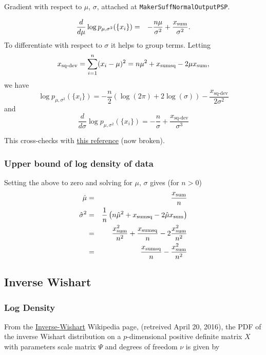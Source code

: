 \documentclass[12pt]{article}
\begin{document}
Gradient with respect to $\mu$, $\sigma$, attached at \texttt{MakerSuffNormalOutputPSP}.

\begin{eqnarray*}
\frac{d}{d\mu} \log p_{\mu,\sigma^2}(\{x_i\}) & = & -\frac{n\mu}{\sigma^2} +
    \frac{x_{\textrm{sum}}}{\sigma^2}.
\end{eqnarray*}
To differentiate with respect to $\sigma$ it helps to group terms.  Letting
\newcommand{\deviance}{x_{\textrm{sq-dev}}}
\[ \deviance = \sum_{i=1}^n (x_i - \mu)^2 = n\mu^2 + \xsumsq - 2 \mu \xsum, \]
we have
\[ \log p_{\mu,\sigma^2}(\{x_i\}) = -\frac{n}{2}(\log(2\pi) + 2\log(\sigma))
   - \frac{\deviance}{2\sigma^2} \]
and
\[ \frac{d}{d\sigma} \log p_{\mu,\sigma^2}(\{x_i\}) = -\frac{n}{\sigma} +
    \frac{\deviance}{\sigma^3} \]

This cross-checks with
\href{http://aleph0.clarku.edu/~djoyce/ma218/meeting12.pdf}{this reference} (now broken).

\subsubsection{Upper bound of log density of data}

Setting the above to zero and solving for $\mu$, $\sigma$ gives (for $n > 0$)
\begin{eqnarray*}
 \hat\mu & = & \frac{x_{\textrm{sum}}}{n} \\
 \hat\sigma^2 & = & \frac{1}{n}\left(n\hat\mu^2 + x_{\textrm{sumsq}} -2\hat\mu x_{\textrm{sum}}\right) \\
  & = & \frac{x_{\textrm{sum}}^2}{n^2} + \frac{x_{\textrm{sumsq}}}{n} - 2\frac{x_{\textrm{sum}}^2}{n^2} \\
  & = & \frac{x_{\textrm{sumsq}}}{n} - \frac{x_{\textrm{sum}}^2}{n^2}
\end{eqnarray*}

\subsection{Inverse Wishart}

\subsubsection{Log Density}

From the
\href{https://en.wikipedia.org/wiki/Inverse-Wishart_distribution}{Inverse-Wishart}
Wikipedia page, (retreived April 20, 2016), the PDF of the inverse
Wishart distribution on a $p$-dimensional positive definite matrix $X$
with parameters scale matrix $\Psi$ and degrees of freedom $\nu$ is
given by
\end{document}
